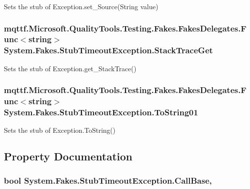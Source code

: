 Sets the stub of Exception.\-set\-\_\-\-Source(\-String value)

\hypertarget{class_system_1_1_fakes_1_1_stub_timeout_exception_a0455ca79ace5006fc71eae4453e471de}{
\subsubsection[{Stack\-Trace\-Get}]{\setlength{\rightskip}{0pt plus 5cm}mqttf.\-Microsoft.\-Quality\-Tools.\-Testing.\-Fakes.\-Fakes\-Delegates.\-Func$<$string$>$ System.\-Fakes.\-Stub\-Timeout\-Exception.\-Stack\-Trace\-Get}}\label{class_system_1_1_fakes_1_1_stub_timeout_exception_a0455ca79ace5006fc71eae4453e471de}


Sets the stub of Exception.\-get\-\_\-\-Stack\-Trace()

\hypertarget{class_system_1_1_fakes_1_1_stub_timeout_exception_a89be23b2a620301e51ecb22e041ecb4a}{
\subsubsection[{To\-String01}]{\setlength{\rightskip}{0pt plus 5cm}mqttf.\-Microsoft.\-Quality\-Tools.\-Testing.\-Fakes.\-Fakes\-Delegates.\-Func$<$string$>$ System.\-Fakes.\-Stub\-Timeout\-Exception.\-To\-String01}}\label{class_system_1_1_fakes_1_1_stub_timeout_exception_a89be23b2a620301e51ecb22e041ecb4a}


Sets the stub of Exception.\-To\-String()



\subsection{Property Documentation}
\hypertarget{class_system_1_1_fakes_1_1_stub_timeout_exception_ae08a3622dd4afc73a1bf7294d776e74e}{
\subsubsection[{Call\-Base}]{\setlength{\rightskip}{0pt plus 5cm}bool System.\-Fakes.\-Stub\-Timeout\-Exception.\-Call\-Base\hspace{0.3cm}{\ttfamily [get]}, {\ttfamily [set]}}}\label{class_system_1_1_fakes_1_1_stub_timeout_exception_ae08a3622dd4afc73a1bf7294d776e74e}


